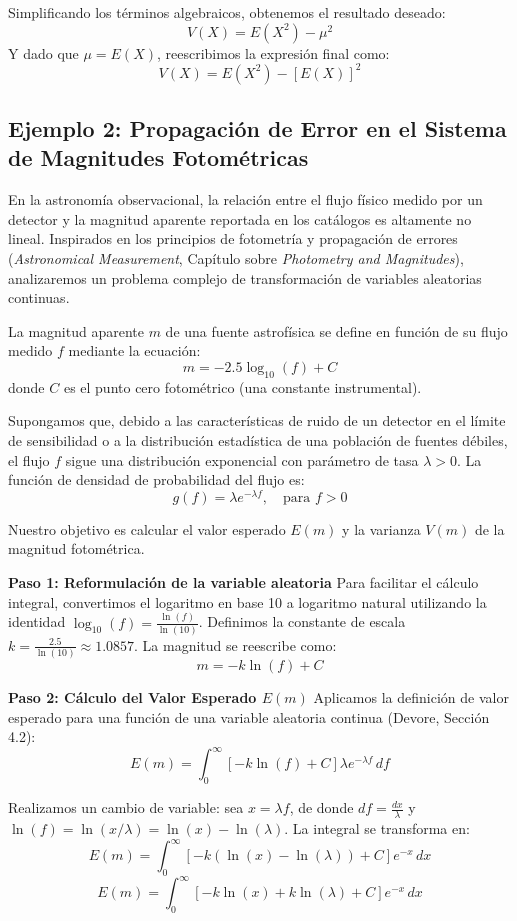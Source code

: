 Simplificando los términos algebraicos, obtenemos el resultado deseado:
$$ V(X) = E(X^2) - \mu^2 $$
Y dado que $\mu = E(X)$, reescribimos la expresión final como:
$$ V(X) = E(X^2) - [E(X)]^2 $$

\subsection{Ejemplo 2: Propagación de Error en el Sistema de Magnitudes Fotométricas}

En la astronomía observacional, la relación entre el flujo físico medido por un detector y la magnitud aparente reportada en los catálogos es altamente no lineal. Inspirados en los principios de fotometría y propagación de errores (\textit{Astronomical Measurement}, Capítulo sobre \textit{Photometry and Magnitudes}), analizaremos un problema complejo de transformación de variables aleatorias continuas.

La magnitud aparente $m$ de una fuente astrofísica se define en función de su flujo medido $f$ mediante la ecuación:
$$ m = -2.5 \log_{10}(f) + C $$
donde $C$ es el punto cero fotométrico (una constante instrumental). 

Supongamos que, debido a las características de ruido de un detector en el límite de sensibilidad o a la distribución estadística de una población de fuentes débiles, el flujo $f$ sigue una distribución exponencial con parámetro de tasa $\lambda > 0$. La función de densidad de probabilidad del flujo es:
$$ g(f) = \lambda e^{-\lambda f}, \quad \text{para } f > 0 $$

Nuestro objetivo es calcular el valor esperado $E(m)$ y la varianza $V(m)$ de la magnitud fotométrica.

\textbf{Paso 1: Reformulación de la variable aleatoria}
Para facilitar el cálculo integral, convertimos el logaritmo en base 10 a logaritmo natural utilizando la identidad $\log_{10}(f) = \frac{\ln(f)}{\ln(10)}$. Definimos la constante de escala $k = \frac{2.5}{\ln(10)} \approx 1.0857$. La magnitud se reescribe como:
$$ m = -k \ln(f) + C $$

\textbf{Paso 2: Cálculo del Valor Esperado $E(m)$}
Aplicamos la definición de valor esperado para una función de una variable aleatoria continua (Devore, Sección 4.2):
$$ E(m) = \int_{0}^{\infty} [-k \ln(f) + C] \lambda e^{-\lambda f} \, df $$

Realizamos un cambio de variable: sea $x = \lambda f$, de donde $df = \frac{dx}{\lambda}$ y $\ln(f) = \ln(x/\lambda) = \ln(x) - \ln(\lambda)$. La integral se transforma en:
$$ E(m) = \int_{0}^{\infty} [-k (\ln(x) - \ln(\lambda)) + C] e^{-x} \, dx $$
$$ E(m) = \int_{0}^{\infty} [-k \ln(x) + k \ln(\lambda) + C] e^{-x} \, dx $$

